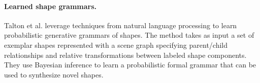 \paragraph*{Learned shape grammars.} Talton et al. \cite{Talton:2012:LDP} leverage techniques
from natural language processing to learn probabilistic generative grammars of shapes. The method takes as input a set of exemplar shapes represented with a scene graph specifying parent/child relationships and
relative transformations between labeled shape components. They use Bayesian inference to learn a probabilistic formal grammar that can be used to synthesize novel shapes. 